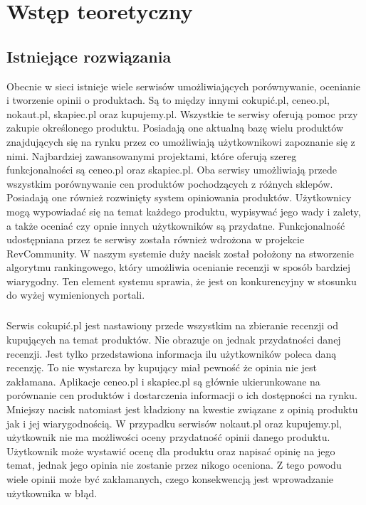\chapter{Wstęp teoretyczny}

\section{Istniejące rozwiązania}
Obecnie w sieci istnieje wiele serwisów umożliwiających porównywanie, ocenianie i tworzenie opinii o produktach. Są to między innymi cokupić.pl,  ceneo.pl, nokaut.pl, skapiec.pl oraz kupujemy.pl. Wszystkie te serwisy oferują pomoc przy zakupie określonego produktu. Posiadają one aktualną bazę wielu produktów znajdujących się na rynku przez co umożliwiają użytkownikowi zapoznanie się z nimi. Najbardziej zawansowanymi projektami, które oferują szereg funkcjonalności są ceneo.pl oraz skapiec.pl. Oba serwisy umożliwiają przede wszystkim porównywanie cen produktów pochodzących z różnych sklepów. Posiadają one  również rozwinięty system opiniowania produktów. Użytkownicy mogą wypowiadać się na temat każdego produktu, wypisywać jego wady i zalety, a także oceniać czy opnie innych użytkowników są przydatne. Funkcjonalność udostępniana przez te serwisy została również wdrożona w projekcie RevCommunity. W naszym systemie duży nacisk został położony na stworzenie algorytmu rankingowego, który umożliwia ocenianie recenzji w sposób bardziej wiarygodny. Ten element systemu sprawia, że jest on konkurencyjny w stosunku do wyżej wymienionych portali. 
\paragraph{}
Serwis cokupić.pl jest nastawiony przede wszystkim na zbieranie recenzji od kupujących na temat produktów. Nie obrazuje on jednak przydatności danej recenzji. Jest tylko przedstawiona informacja ilu użytkowników poleca daną recenzję. To nie wystarcza by kupujący miał pewność że opinia nie jest zakłamana. Aplikacje ceneo.pl i skapiec.pl są głównie ukierunkowane na porównanie cen produktów i dostarczenia informacji o ich dostępności na rynku. Mniejszy nacisk natomiast jest kładziony na kwestie związane z opinią produktu jak i jej wiarygodnością.  W przypadku serwisów nokaut.pl oraz kupujemy.pl, użytkownik nie ma możliwości oceny przydatność opinii danego produktu. Użytkownik może wystawić ocenę dla produktu oraz napisać opinię na jego temat, jednak jego opinia nie zostanie przez nikogo oceniona. Z tego powodu wiele opinii może być zakłamanych, czego konsekwencją jest wprowadzanie użytkownika w błąd. 
